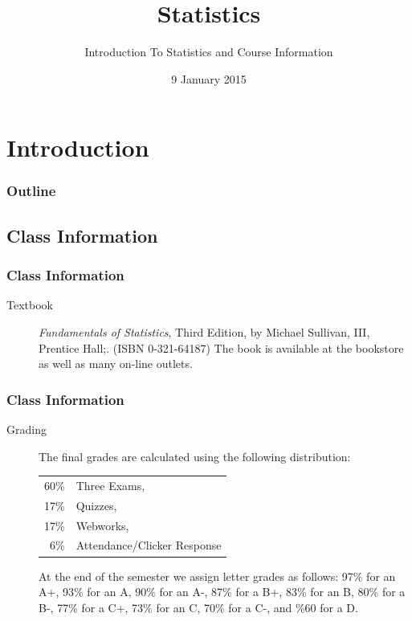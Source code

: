 
\section{Introduction}

\title{Statistics}
\subtitle{Introduction To Statistics and Course Information}

\date{9 January 2015}

\begin{frame}
  \titlepage
\end{frame}

\begin{frame}
  \frametitle{Outline}
  \tableofcontents[hideothersubsections,sectionstyle=show/hide]
\end{frame}


\subsection{Class Information}


\begin{frame}
  \frametitle{Class Information}

\begin{description}
\item[Textbook] {\em Fundamentals of Statistics}, Third Edition, by
  Michael Sullivan, III, Prentice Hall;. (ISBN 0-321-64187) The book
  is available at the bookstore as well as many on-line outlets.

\end{description}

\end{frame}


\begin{frame}
  \frametitle{Class Information}

\begin{description}
\item[Grading] %
  
  The final grades are calculated using the following distribution:
    \begin{tabular}[t]{rl}
      60\% & Three Exams, \\
      17\% & Quizzes, \\
      17\% & Webworks, \\
      6\%  & Attendance/Clicker Response \\
    \end{tabular}
  
    At the end of the semester we assign letter grades as follows:
    97\% for an A+, 93\% for an A, 90\% for an A-, 
    87\% for a  B+, 83\% for an B, 80\% for a B-, 
    77\% for a  C+, 73\% for an C, 70\% for a C-, 
    and \%60 for a D.

\end{description}

\end{frame}



